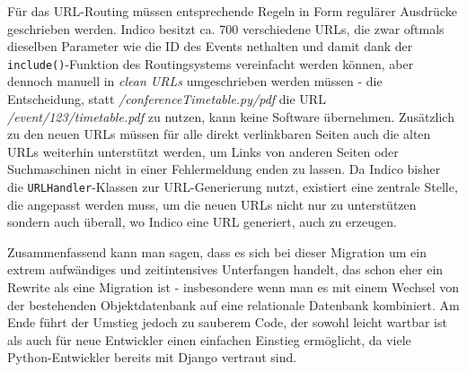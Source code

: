 Für das URL-Routing müssen entsprechende Regeln in Form regulärer Ausdrücke geschrieben werden.
Indico besitzt ca. 700 verschiedene URLs, die zwar oftmals dieselben Parameter wie die ID des Events
nethalten und damit dank der \lstinline{include()}-Funktion des Routingsystems vereinfacht werden
können, aber dennoch manuell in \emph{clean URLs} umgeschrieben werden müssen - die Entscheidung,
statt \emph{/conferenceTimetable.py/pdf} die URL \emph{/event/123/timetable.pdf} zu
nutzen, kann keine Software übernehmen. Zusätzlich zu den neuen URLs müssen für alle direkt
verlinkbaren Seiten auch die alten URLs weiterhin unterstützt werden, um Links von
anderen Seiten oder Suchmaschinen nicht in einer Fehlermeldung enden zu lassen. Da Indico bisher die
\lstinline{URLHandler}-Klassen zur URL-Generierung nutzt, existiert eine zentrale Stelle, die
angepasst werden muss, um die neuen URLs nicht nur zu unterstützen sondern auch überall, wo Indico
eine URL generiert, auch zu erzeugen.

Zusammenfassend kann man sagen, dass es sich bei dieser Migration um ein extrem aufwändiges und
zeitintensives Unterfangen handelt, das schon eher ein Rewrite als eine Migration ist - insbesondere
wenn man es mit einem Wechsel von der bestehenden Objektdatenbank auf eine relationale Datenbank
kombiniert. Am Ende führt der Umstieg jedoch zu sauberem Code, der sowohl leicht wartbar ist als
auch für neue Entwickler einen einfachen Einstieg ermöglicht, da viele Python-Entwickler bereits mit
Django vertraut sind.


